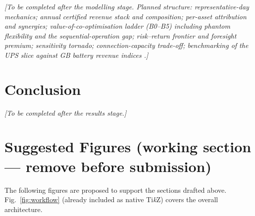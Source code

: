\documentclass[lettersize,journal]{IEEEtran}
\begin{document}
\textit{[To be completed after the modelling stage. Planned structure: representative-day mechanics; annual certified revenue stack and composition; per-asset attribution and synergies; value-of-co-optimisation ladder (B0--B5) including phantom flexibility and the sequential-operation gap; risk--return frontier and foresight premium; sensitivity tornado; connection-capacity trade-off; benchmarking of the UPS slice against GB battery revenue indices \cite{modo2026benchmark}.]}

\section{Conclusion}\label{sec:conclusion}

\textit{[To be completed after the results stage.]}

\section*{Suggested Figures (working section --- remove before submission)}

The following figures are proposed to support the sections drafted above. Fig.~\ref{fig:workflow} (already included as native Ti\emph{k}Z) covers the overall architecture.
\end{document}
